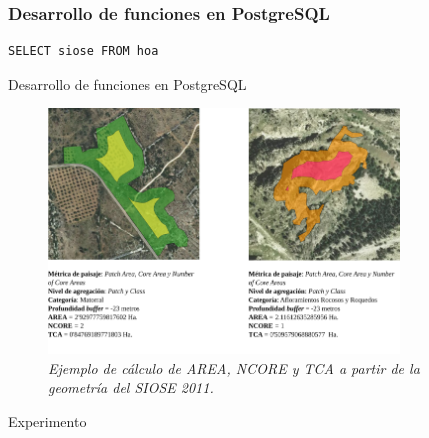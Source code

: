\begin{frame}[fragile]
\frametitle{Desarrollo de funciones en PostgreSQL}
\begin{verbatim}
SELECT siose FROM hoa
\end{verbatim}
\end{frame}



\begin{frame}{Desarrollo de funciones en PostgreSQL}
\begin{figure}
\includegraphics[height=6.5cm]{Metodologia/Figs/figuraejemplo}
\vspace{-0.5cm}
\caption{\textit{Ejemplo de cálculo de AREA, NCORE y TCA a partir de la geometría del SIOSE 2011.}}
\end{figure}
\end{frame}


\begin{frame}{}
Experimento
\end{frame}
